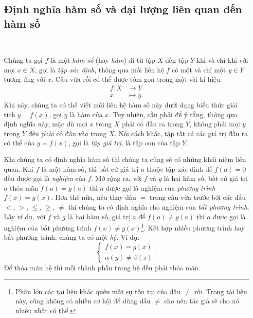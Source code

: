 \subsection{Định nghĩa hàm số và đại lượng liên quan đến hàm số}

\ %

Chúng ta gọi $f$ là một \emph{hàm số} (hay \emph{hàm}) đi từ tập $X$ đến tập $Y$ khi và chỉ khi với mọi $x\in X$, gọi là \emph{tập xác định}, thông qua mối liên hệ $f$ có một và chỉ một $y\in Y$ tương ứng với $x$. Câu vừa rồi có thể được tóm gọn trong một vài kí hiệu: \begin{align*}f: X &\to Y \\ x &\mapsto y.\end{align*} Khi này, chúng ta có thể viết mối liên hệ hàm số này dưới dạng biểu thức giải tích $y=f(x)$, gọi $y$ là hàm của $x$. Tuy nhiên, cần phải để ý rằng, thông qua định nghĩa này, mặc dù mọi $x$ trong $X$ phải có đầu ra trong $Y$, không phải mọi $y$ trong $Y$ đều phải có đầu vào trong $X$. Nói cách khác, tập tất cả các giá trị đầu ra có thể của $y=f(x)$, gọi là \emph{tập giá trị}, là tập con của tập $Y$.

Khi chúng ta có định nghĩa hàm số thì chúng ta cũng sẽ có những khái niệm liên quan. Khi $f$ là một hàm số, thì bất cứ giá trị $a$ thuộc tập xác định để $f(a) = 0$ đều được gọi là \emph{nghiệm} của $f$. Mở rộng ra, với $f$ và $g$ là hai hàm số, bất cứ giá trị $a$ thỏa mãn $f(a) = g(a)$ thì $a$ được gọi là nghiệm của \emph{phương trình} $f(x) = g(x)$. Hơn thế nữa, nếu thay dấu $=$ trong câu vừa trước bởi các dấu $<$, $>$, $\leq$, $\geq$, $\neq$ thì chúng ta có định nghĩa cho nghiệm của \emph{bất phương trình}. Lấy ví dụ, với $f$ và $g$ là hai hàm số, giá trị $a$ để $f(a) \neq g(a)$ thì $a$ được gọi là nghiệm của bất phương trình $f(x) \neq g(x)$\footnote{Phần lớn các tại liệu khác quên mất sự tồn tại của dấu $\neq$ rồi. Trong tài liệu này, cũng không có nhiều cơ hội để dùng dấu $\neq$ cho nên tác giả sẽ cho nó nhiều  nhất có thể.}. Kết hợp nhiều phương trình hay bất phương trình, chúng ta có một \emph{hệ}. Ví dụ:
$$
\begin{cases}
   f(x) = g(x) \\
   \alpha(y) \neq \beta(z)
\end{cases}.
$$
Để thỏa mãn hệ thì mỗi thành phần trong hệ đều phải thỏa mãn.

